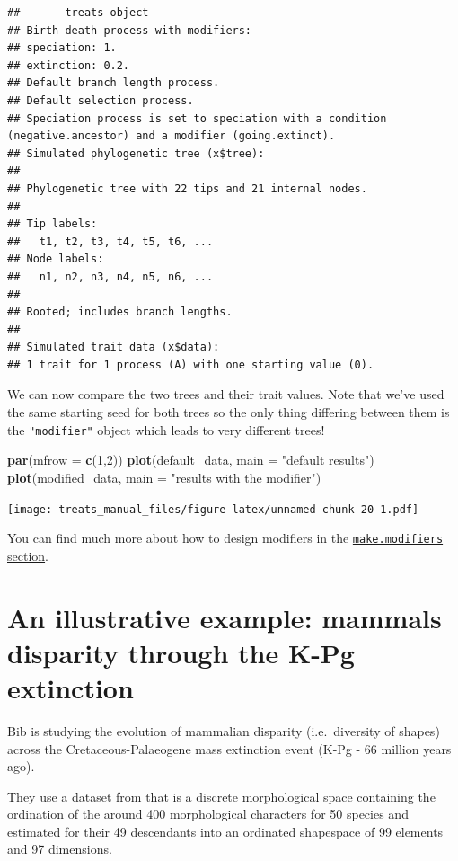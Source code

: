 \documentclass[
]{book}
\newenvironment{Shaded}{\begin{snugshade}}{\end{snugshade}}
\newcommand{\DataTypeTok}[1]{\textcolor[rgb]{0.13,0.29,0.53}{#1}}
\newcommand{\DecValTok}[1]{\textcolor[rgb]{0.00,0.00,0.81}{#1}}
\newcommand{\KeywordTok}[1]{\textcolor[rgb]{0.13,0.29,0.53}{\textbf{#1}}}
\newcommand{\NormalTok}[1]{#1}
\newcommand{\StringTok}[1]{\textcolor[rgb]{0.31,0.60,0.02}{#1}}
\begin{document}
\begin{verbatim}
##  ---- treats object ---- 
## Birth death process with modifiers:
## speciation: 1.
## extinction: 0.2.
## Default branch length process.
## Default selection process.
## Speciation process is set to speciation with a condition (negative.ancestor) and a modifier (going.extinct).
## Simulated phylogenetic tree (x$tree):
## 
## Phylogenetic tree with 22 tips and 21 internal nodes.
## 
## Tip labels:
##   t1, t2, t3, t4, t5, t6, ...
## Node labels:
##   n1, n2, n3, n4, n5, n6, ...
## 
## Rooted; includes branch lengths.
## 
## Simulated trait data (x$data):
## 1 trait for 1 process (A) with one starting value (0).
\end{verbatim}

We can now compare the two trees and their trait values.
Note that we've used the same starting seed for both trees so the only thing differing between them is the \texttt{"modifier"} object which leads to very different trees!

\begin{Shaded}
\begin{Highlighting}[]
\KeywordTok{par}\NormalTok{(}\DataTypeTok{mfrow =} \KeywordTok{c}\NormalTok{(}\DecValTok{1}\NormalTok{,}\DecValTok{2}\NormalTok{))}
\KeywordTok{plot}\NormalTok{(default\_data, }\DataTypeTok{main =} \StringTok{"default results"}\NormalTok{)}
\KeywordTok{plot}\NormalTok{(modified\_data, }\DataTypeTok{main =} \StringTok{"results with the modifier"}\NormalTok{)}
\end{Highlighting}
\end{Shaded}

\texttt{[image: treats\_manual\_files/figure-latex/unnamed-chunk-20-1.pdf]}

You can find much more about how to design modifiers in the \protect\hyperlink{makemodifiers}{\texttt{make.modifiers} section}.

\hypertarget{kpgexample}{%
\section{An illustrative example: mammals disparity through the K-Pg extinction}\label{kpgexample}}

Bib is studying the evolution of mammalian disparity (i.e.~diversity of shapes) across the Cretaceous-Palaeogene mass extinction event (K-Pg - 66 million years ago).

They use a dataset from \citet{beckancient2014} that is a discrete morphological space containing the ordination of the around 400 morphological characters for 50 species and estimated for their 49 descendants into an ordinated shapespace of 99 elements and 97 dimensions.
\end{document}
